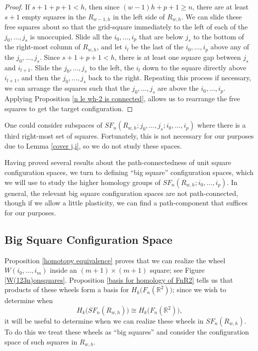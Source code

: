 \documentclass[pagebackref,colorlinks,citecolor=blue,linkcolor=blue,urlcolor=blue,filecolor=blue]{article}
\theoremstyle{definition}\newtheorem{definition}[thm]{Definition}
\theoremstyle{definition}
\newcommand{\R}{\ensuremath{\mathbb{R}}}
\begin{document}
\begin{proof}
If $s+1+p+1<h$, then since $(w-1)h+p+1\ge n$, there are at least $s+1$ empty squares in the $R_{w-1,h}$ in the left side of $R_{w,h}$. 
We can slide these free squares about so that the grid-square immediately to the left of each of the $j_{0},\dots, j_{s}$ is unoccupied.
Slide all the $i_{0},\dots, i_{p}$ that are below $j_{s}$ to the bottom of the right-most column of $R_{w,h}$, and let $i_{l}$ be the last of the $i_{0},\dots, i_{p}$ above any of the $j_{0}, \dots, j_{s}$.
Since $s+1+p+1<h$, there is at least one square gap between $j_{s}$ and $i_{l+1}$.
Slide the $j_{0}, \dots, j_{s}$ to the left, the $i_{l}$ down to the square directly above $i_{l+1}$, and then the $j_{0}, \dots, j_{s}$ back to the right.
Repeating this process if necessary, we can arrange the squares such that the $j_{0},\dots, j_{s}$ are above the $i_{0}, \dots, i_{p}$.
Applying Proposition \ref{n le wh-2 is connected}, allows us to rearrange the free squares to get the target configuration.
\end{proof}

One could consider subspaces of $SF_{n}(R_{w,h}; j_{0},\dots, j_{s}; i_{0}, \dots, i_{p})$ where there is a third right-most set of squares.
Fortunately, this is not necessary for our purposes due to Lemma \ref{cover j,i}, so we do not study these spaces.

Having proved several results about the path-connectedness of unit square configuration spaces, we turn to defining ``big square'' configuration spaces, which we will use to study the higher homology groups of $SF_{n}(R_{w,h}; i_{0}, \dots, i_{p})$.
In general, the relevant big square configuration spaces are not path-connected, though if we allow a little plasticity, we can find a path-component that suffices for our purposes.

\subsection{Big Square Configuration Space}\label{Big square config}
Proposition \ref{homotopy equivalence} proves that we can realize the wheel $W(i_{0}, \dots, i_{m})$ inside an $(m+1)\times(m+1)$ square; see Figure \ref{W(123n)onsquares}.
Proposition \ref{basis for homology of FnR2} tells us that products of these wheels form a basis for $H_{k}\big(F_{n}(\R^{2})\big)$; since we wish to determine when
\[
H_{k}\big(SF_{n}(R_{w,h})\big)\cong H_{k}\big(F_{n}(\R^{2})\big),
\]
it will be useful to determine when we can realize these wheels in $SF_{n}(R_{w,h})$.
To do this we treat these wheels as ``big squares'' and consider the configuration space of such squares in $R_{w,h}$.
\end{document}
